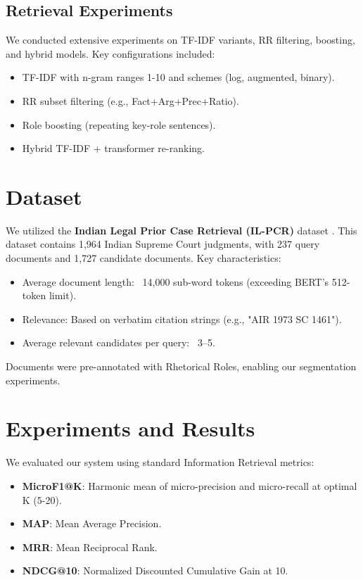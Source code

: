 \documentclass[11pt]{article}
\begin{document}
\subsection{Retrieval Experiments}
We conducted extensive experiments on TF-IDF variants, RR filtering, boosting, and hybrid models. Key configurations included:
\begin{itemize}
    \item TF-IDF with n-gram ranges 1-10 and schemes (log, augmented, binary).
    \item RR subset filtering (e.g., Fact+Arg+Prec+Ratio).
    \item Role boosting (repeating key-role sentences).
    \item Hybrid TF-IDF + transformer re-ranking.
\end{itemize}

\section{Dataset}

We utilized the \textbf{Indian Legal Prior Case Retrieval (IL-PCR)} dataset \citep{ilturdataset}. This dataset contains 1,964 Indian Supreme Court judgments, with 237 query documents and 1,727 candidate documents. Key characteristics:
\begin{itemize}
    \item Average document length: ~14,000 sub-word tokens (exceeding BERT's 512-token limit).
    \item Relevance: Based on verbatim citation strings (e.g., "AIR 1973 SC 1461").
    \item Average relevant candidates per query: ~3–5.
\end{itemize}
Documents were pre-annotated with Rhetorical Roles, enabling our segmentation experiments.

\section{Experiments and Results}

We evaluated our system using standard Information Retrieval metrics:
\begin{itemize}
    \item \textbf{MicroF1@K}: Harmonic mean of micro-precision and micro-recall at optimal K (5-20).
    \item \textbf{MAP}: Mean Average Precision.
    \item \textbf{MRR}: Mean Reciprocal Rank.
    \item \textbf{NDCG@10}: Normalized Discounted Cumulative Gain at 10.
\end{itemize}
\end{document}
